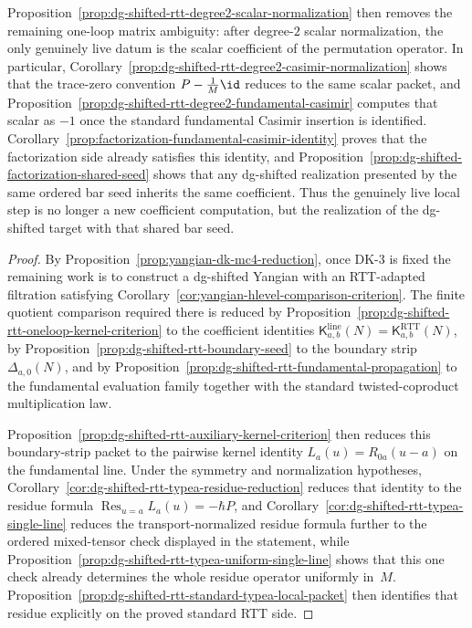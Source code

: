 \begin{proposition}
Proposition~\ref{prop:dg-shifted-rtt-degree2-scalar-normalization}
then removes the remaining one-loop matrix ambiguity: after
degree-$2$ scalar normalization, the only genuinely live datum is the
scalar coefficient of the permutation operator. In particular,
Corollary~\ref{prop:dg-shifted-rtt-degree2-casimir-normalization}
shows that the trace-zero convention
$P-\frac{1}{M}\id$ reduces to the same scalar packet, and
Proposition~\ref{prop:dg-shifted-rtt-degree2-fundamental-casimir}
computes that scalar as $-1$ once the standard fundamental Casimir
insertion is identified.
Corollary~\ref{prop:factorization-fundamental-casimir-identity} proves
that the factorization side already satisfies this identity, and
Proposition~\ref{prop:dg-shifted-factorization-shared-seed} shows that
any dg-shifted realization presented by the same ordered bar seed
inherits the same coefficient. Thus the genuinely live local step is
no longer a new coefficient computation, but the realization of the
dg-shifted target with that shared bar seed.
\end{proposition}

\begin{proof}
By Proposition~\ref{prop:yangian-dk-mc4-reduction}, once DK-3 is fixed
the remaining work is to construct a dg-shifted Yangian with an
RTT-adapted filtration satisfying
Corollary~\ref{cor:yangian-hlevel-comparison-criterion}. The finite
quotient comparison required there is reduced by
Proposition~\ref{prop:dg-shifted-rtt-oneloop-kernel-criterion} to the
coefficient identities
$\mathsf{K}^{\mathrm{line}}_{a,b}(N)
=\mathsf{K}^{\mathrm{RTT}}_{a,b}(N)$,
by Proposition~\ref{prop:dg-shifted-rtt-boundary-seed} to the boundary
strip $\Delta_{a,0}(N)$, and by
Proposition~\ref{prop:dg-shifted-rtt-fundamental-propagation} to the
fundamental evaluation family together with the standard
twisted-coproduct multiplication law.

Proposition~\ref{prop:dg-shifted-rtt-auxiliary-kernel-criterion} then
reduces this boundary-strip packet to the pairwise kernel identity
$L_a(u)=R_{0a}(u-a)$ on the fundamental line. Under the symmetry and
normalization hypotheses,
Corollary~\ref{cor:dg-shifted-rtt-typea-residue-reduction} reduces that
identity to the residue formula
$\operatorname*{Res}_{u=a}L_a(u)=-\hbar P$, and
Corollary~\ref{cor:dg-shifted-rtt-typea-single-line} reduces the
transport-normalized residue formula further to the ordered
mixed-tensor check displayed in
the statement, while
Proposition~\ref{prop:dg-shifted-rtt-typea-uniform-single-line}
shows that this one check already determines the whole residue
operator uniformly in~$M$. Proposition~\ref{prop:dg-shifted-rtt-standard-typea-local-packet}
then identifies that residue explicitly on the proved standard
RTT side.
\end{proof}

